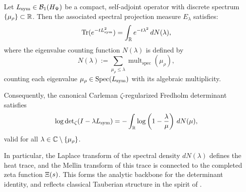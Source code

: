 \begin{lemma}
\label{lem:spectral_measure_heat_semigroup}
Let \( L_{\mathrm{sym}} \in \mathcal{B}_1(H_{\Psi}) \) be a compact, self-adjoint operator with discrete spectrum \( \{ \mu_\rho \} \subset \mathbb{R} \). Then the associated spectral projection measure \( E_\lambda \) satisfies:
\[
\operatorname{Tr}(e^{-t L_{\mathrm{sym}}^2}) = \int_{\mathbb{R}} e^{-t\lambda^2} \, dN(\lambda),
\]
where the eigenvalue counting function \( N(\lambda) \) is defined by
\[
N(\lambda) := \sum_{\mu_\rho \leq \lambda} \operatorname{mult}_{\mathrm{spec}}(\mu_\rho),
\]
counting each eigenvalue \( \mu_\rho \in \operatorname{Spec}(L_{\mathrm{sym}}) \) with its algebraic multiplicity.

\medskip

\noindent
Consequently, the canonical Carleman \(\zeta\)-regularized Fredholm determinant satisfies
\[
\log \det\nolimits_{\zeta}(I - \lambda L_{\mathrm{sym}}) = - \int_{\mathbb{R}} \log\left(1 - \frac{\lambda}{\mu} \right) \, dN(\mu),
\]
valid for all \( \lambda \in \mathbb{C} \setminus \{ \mu_\rho \} \).

\medskip

\noindent
In particular, the Laplace transform of the spectral density \( dN(\lambda) \) defines the heat trace, and the Mellin transform of this trace is connected to the completed zeta function \( \Xi(s) \). This forms the analytic backbone for the determinant identity, and reflects classical Tauberian structure in the spirit of \cite{Korevaar2004Tauberian}.
\end{lemma}
